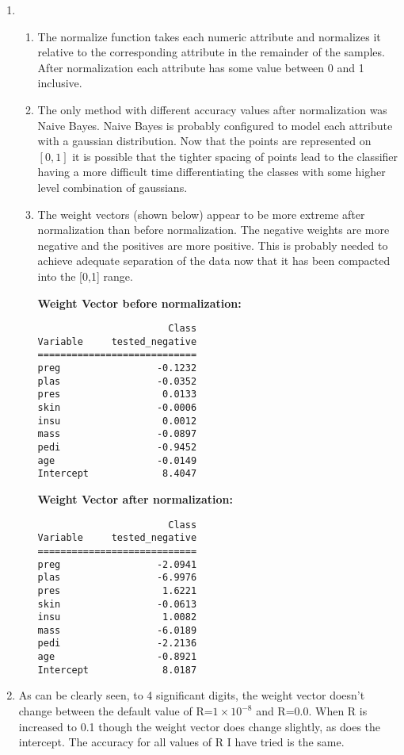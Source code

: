 \documentclass[12pt]{article}
\begin{document}
\begin{enumerate}
\begin{enumerate}
\item %
\begin{enumerate}
\item
The normalize function takes each numeric  attribute and normalizes it relative to the corresponding attribute in the remainder of the samples. After normalization each attribute has some value between 0 and 1 inclusive. 
\item
The only method with different accuracy values after normalization was Naive Bayes. Naive Bayes is probably configured to model each attribute with a gaussian distribution. Now that the points are represented on $[0,1]$ it is possible that the tighter spacing of points lead to the classifier having a more difficult time differentiating the classes with some higher level combination of gaussians. 
\item %

The weight vectors (shown below) appear to be more extreme after normalization than before normalization. The negative weights are more negative and the positives are more positive. This is probably needed to achieve adequate separation of the data now that it has been compacted into the [0,1] range.


{\bf Weight Vector before normalization:}
\begin{verbatim}
                       Class
Variable     tested_negative
============================
preg                 -0.1232
plas                 -0.0352
pres                  0.0133
skin                 -0.0006
insu                  0.0012
mass                 -0.0897
pedi                 -0.9452
age                  -0.0149
Intercept             8.4047
\end{verbatim}

{\bf Weight Vector after normalization:}
\begin{verbatim}
                       Class
Variable     tested_negative
============================
preg                 -2.0941
plas                 -6.9976
pres                  1.6221
skin                 -0.0613
insu                  1.0082
mass                 -6.0189
pedi                 -2.2136
age                  -0.8921
Intercept             8.0187

\end{verbatim}

\end{enumerate}

\item %
As can be clearly seen, to 4 significant digits, the weight vector doesn't change between the default value of R=$1\times10^{-8}$ and R=0.0. When R is increased to 0.1 though the weight vector does change slightly, as does the intercept. The accuracy for all values of R I have tried is the same.




\end{enumerate}
\end{enumerate}
\end{document}
